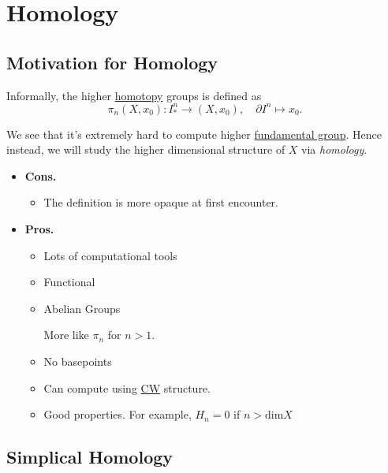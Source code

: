 \section{Homology}
\subsection{Motivation for Homology}
Informally, the higher \hyperref[def:homotopy]{homotopy} groups is defined as
\[
	\pi _{n} (X, x_0)\colon I^n_\ast \to (X, x_0),\quad \partial I^n \mapsto x_0.
\]

\begin{figure}[H]
	\centering
	\label{fig:higher-homotopy-group-dim2}
\end{figure}


We see that it's extremely hard to compute higher \hyperref[def:fundamental-group]{fundamental group}. Hence instead,
we will study the higher dimensional structure of \(X\) via \emph{homology}.

\begin{itemize}
	\item \textbf{Cons.}
	      \begin{itemize}
		      \item The definition is more opaque at first encounter.
	      \end{itemize}
	\item \textbf{Pros.}
	      \begin{itemize}
		      \item Lots of computational tools
		      \item Functional
		      \item Abelian Groups
		            \begin{remark}
			            More like \(\pi _n\) for \(n>1\).
		            \end{remark}
		      \item No basepoints
		      \item Can compute using \hyperref[def:CW-subcomplex]{CW} structure.
		      \item Good properties. For example, \(H_{n} = 0\) if \(n > \mathrm{dim} X\)
	      \end{itemize}
\end{itemize}

\subsection{Simplical Homology}
